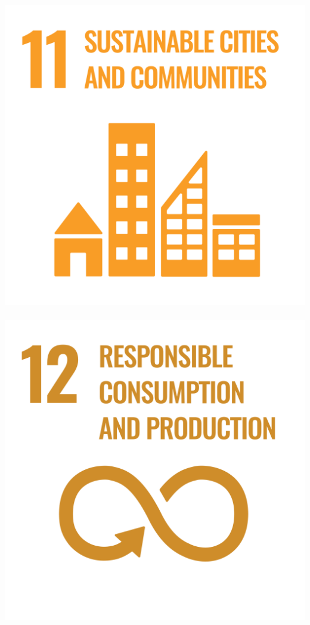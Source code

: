 \documentclass[../SustainableHEP.tex]{subfiles}
\begin{document}
\begin{center}
\includegraphics[width=\SDGsize]{Sections/Figs/Common/SDG_11_SustainableCities.png}~%
\includegraphics[width=\SDGsize]{Sections/Figs/Common/SDG_12_ResponsibleConsumption.png}~%

\end{center}
\end{document}
